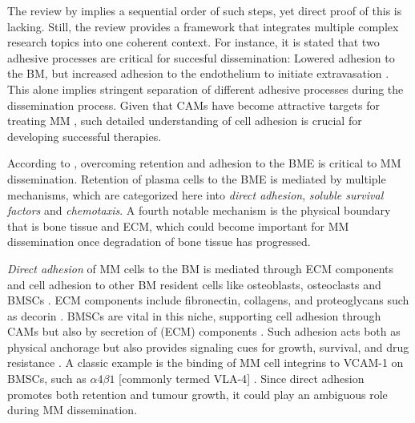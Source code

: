 The review by \citet{zeissigTumourDisseminationMultiple2020} implies a
sequential order of such steps, yet direct proof of this is lacking. Still, the
review provides a framework that integrates multiple complex research topics
into one coherent context. For instance, it is stated that two adhesive
processes are critical for succesful dissemination: Lowered adhesion to the \ac{BM},
but increased adhesion to the endothelium to initiate extravasation
\cite{asosinghUniquePathwayHoming2001a,
    mrozikTherapeuticTargetingNcadherin2015}. This alone implies stringent
separation of different adhesive processes during the dissemination process.
Given that \acp{CAM} have become attractive targets for
treating \ac{MM} \cite{bouzerdanAdhesionMoleculesMultiple2022,
    katzAdhesionMoleculesLifelines2010}, such detailed understanding of cell
adhesion is crucial for developing successful therapies.


%
\label{sec:intro_myeloma_retention}%
According to \citet{zeissigTumourDisseminationMultiple2020}, overcoming
retention and adhesion to the BME is critical to \ac{MM} dissemination. Retention of
plasma cells to the BME is mediated by multiple mechanisms, which are
categorized here into \emph{direct adhesion}, \emph{soluble survival factors}
and \emph{chemotaxis}. A fourth notable mechanism is the physical boundary that
is bone tissue and \ac{ECM}, which could become important for
\ac{MM} dissemination once degradation of bone tissue has progressed.

\emph{Direct adhesion} of \ac{MM} cells to the \ac{BM} is mediated through
\ac{ECM} components and cell adhesion to other \ac{BM} resident cells like
osteoblasts, osteoclasts and \acp{BMSC} \cite{teohINTERACTIONTUMORHOST1997,
    bouzerdanAdhesionMoleculesMultiple2022}. \ac{ECM} components include
fibronectin, collagens, and proteoglycans such as decorin
\cite{huDecorinmediatedSuppressionTumorigenesis2021,
    huangHigherDecorinLevels2015, katzAdhesionMoleculesLifelines2010,
    kiblerAdhesiveInteractionsHuman1998}. \acp{BMSC} are vital in this niche,
supporting cell adhesion through \acp{CAM} but also by secretion of (\ac{ECM})
components \cite{katzAdhesionMoleculesLifelines2010}. Such adhesion acts both as
physical anchorage but also provides signaling cues for growth, survival, and
drug resistance \cite{chenContributionBoneMarrow2020}. A classic example is the
binding of \ac{MM} cell integrins to \ac{VCAM-1} on \acp{BMSC}, such as $\alpha4\beta1$ [commonly termed \ac{VLA-4}]
\cite{bouzerdanAdhesionMoleculesMultiple2022}. Since direct adhesion promotes
both retention and tumour growth, it could play an ambiguous role during \ac{MM}
dissemination.

